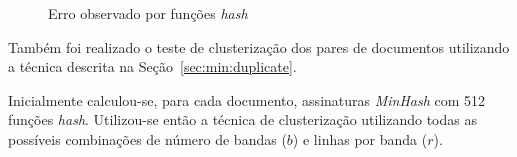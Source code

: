 \begin{figure}[!htbp]
{}
\caption{Erro observado por funções \emph{hash}}
\label{fig:min:result}
\end{figure}

Também foi realizado o teste de clusterização dos pares de documentos utilizando a técnica descrita na Seção~\ref{sec:min:duplicate}. 

Inicialmente calculou-se, para cada documento, assinaturas \emph{MinHash} com 512 funções \emph{hash}. Utilizou-se então a técnica de clusterização utilizando todas as possíveis combinações de número de bandas ($b$) e linhas por banda ($r$). 

